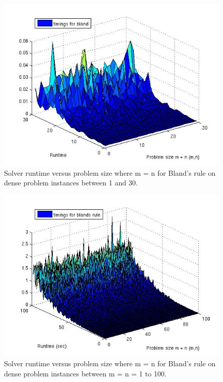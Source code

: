 \documentclass[9pt]{article}
\begin{document}
\begin{small}
\begin{figure}[tbp]
\centering
\includegraphics[scale=0.5]{m30blandtimingversussize.jpg}
\caption{Solver runtime versus problem size where m = n for Bland's rule on dense problem instances between 1 and 30.}
\end{figure}

\begin{figure}[tbp]
\centering
\includegraphics[scale=0.5]{m100blandtimingversussize.jpg}
\caption{Solver runtime versus problem size where m = n for Bland's rule on dense problem instances between m = n = 1 to 100.}
\end{figure}


\end{small}
\end{document}
